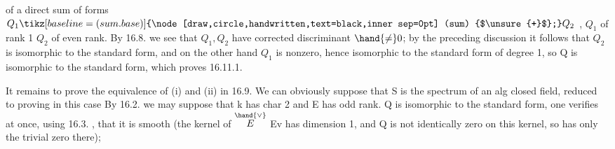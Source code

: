 
of a direct sum of forms $Q_1 \tikz[baseline=(sum.base)]{\node[draw,circle,handwritten,text=black,inner sep=0pt] (sum) {$\unsure{+}$};} Q_2$ , $Q_1$ of rank 1  $Q_2$ of even rank.
By 16.8. we see that $Q_1,Q_2$ have corrected discriminant
$\hand{\neq} 0$; by the preceding discussion it follows that $Q_2$ is isomorphic to the
standard form, and on the other hand $Q_1$ is nonzero, hence isomorphic to the
standard form of degree 1, so Q is isomorphic to the standard form, which
proves 16.11.1.

It remains to prove the equivalence of (i) and (ii) in 16.9. We can
obviously suppose that S is the spectrum of an alg closed field,  
reduced to proving in this case 
By 16.2. we may suppose that k has char 2 and E has odd
rank. 
  Q is isomorphic to the
standard form,  one verifies at once, using 16.3. , that it
is smooth (the kernel of $\overset{\hand{\vee}}{E}$ \hand{$\longrightarrow$}Ev has dimension 1, and Q is not identically
zero on this kernel, so has only the trivial zero there); 
